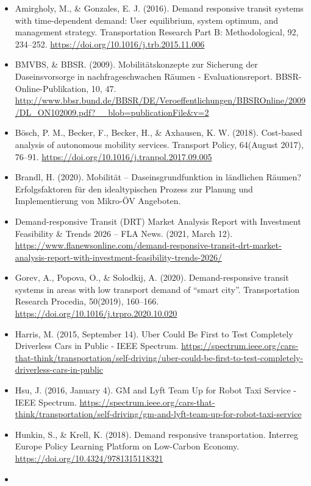 \documentclass[
]{book}
\providecommand{\tightlist}{%
  \setlength{\itemsep}{0pt}\setlength{\parskip}{0pt}}
\begin{document}
\begin{itemize}
\tightlist
\item
  Amirgholy, M., \& Gonzales, E. J. (2016). Demand responsive transit systems with time-dependent demand: User equilibrium, system optimum, and management strategy. Transportation Research Part B: Methodological, 92, 234--252. \url{https://doi.org/10.1016/j.trb.2015.11.006}
\item
  BMVBS, \& BBSR. (2009). Mobilitätskonzepte zur Sicherung der Daseinsvorsorge in nachfrageschwachen Räumen - Evaluationsreport. BBSR-Online-Publikation, 10, 47. \url{http://www.bbsr.bund.de/BBSR/DE/Veroeffentlichungen/BBSROnline/2009/DL_ON102009.pdf?__blob=publicationFile\&v=2}
\item
  Bösch, P. M., Becker, F., Becker, H., \& Axhausen, K. W. (2018). Cost-based analysis of autonomous mobility services. Transport Policy, 64(August 2017), 76--91. \url{https://doi.org/10.1016/j.tranpol.2017.09.005}
\item
  Brandl, H. (2020). Mobilität -- Daseinsgrundfunktion in ländlichen Räumen? Erfolgsfaktoren für den idealtypischen Prozess zur Planung und Implementierung von Mikro-ÖV Angeboten.
\item
  Demand-responsive Transit (DRT) Market Analysis Report with Investment Feasibility \& Trends 2026 -- FLA News. (2021, March 12). \url{https://www.flanewsonline.com/demand-responsive-transit-drt-market-analysis-report-with-investment-feasibility-trends-2026/}
\item
  Gorev, A., Popova, O., \& Solodkij, A. (2020). Demand-responsive transit systems in areas with low transport demand of ``smart city''. Transportation Research Procedia, 50(2019), 160--166. \url{https://doi.org/10.1016/j.trpro.2020.10.020}
\item
  Harris, M. (2015, September 14). Uber Could Be First to Test Completely Driverless Cars in Public - IEEE Spectrum. \url{https://spectrum.ieee.org/cars-that-think/transportation/self-driving/uber-could-be-first-to-test-completely-driverless-cars-in-public}
\item
  Hsu, J. (2016, January 4). GM and Lyft Team Up for Robot Taxi Service - IEEE Spectrum. \url{https://spectrum.ieee.org/cars-that-think/transportation/self-driving/gm-and-lyft-team-up-for-robot-taxi-service}
\item
  Hunkin, S., \& Krell, K. (2018). Demand responsive transportation. Interreg Europe Policy Learning Platform on Low-Carbon Economy. \url{https://doi.org/10.4324/9781315118321}
\item

\end{itemize}
\end{document}
